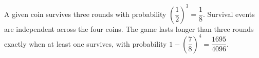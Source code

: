 A given coin survives three rounds with probability $(\dfrac{1}{2})^3=\dfrac{1}{8}$. Survival events are independent across the four coins. The game lasts longer than three rounds exactly when at least one survives, with probability $1-(\dfrac{7}{8})^4=\boxed{\dfrac{1695}{4096}}$.
